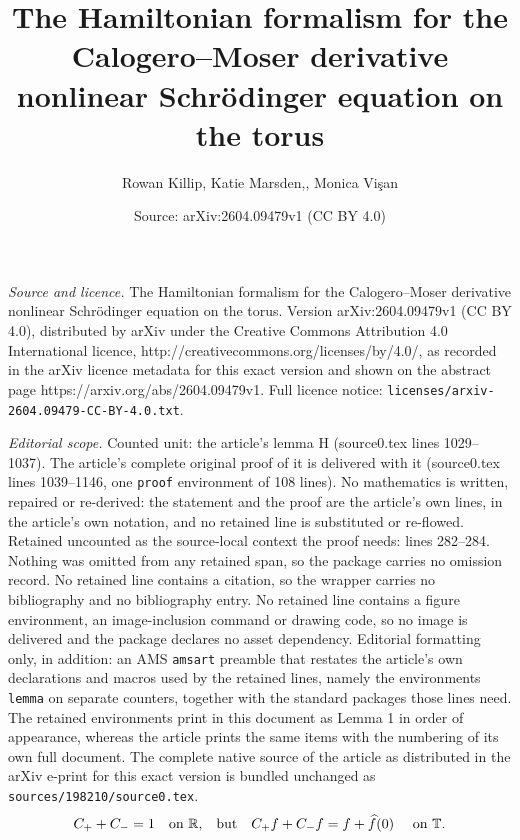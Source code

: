 \documentclass[10pt,a4paper]{amsart}
\title{The Hamiltonian formalism for the Calogero--Moser derivative nonlinear Schr\"odinger equation on the torus}
\author{Rowan Killip, Katie Marsden,, Monica Vi\c{s}an}
\date{Source: arXiv:2604.09479v1 (CC BY 4.0)}
\newcommand{\R}{\mathbb{R}}
\newcommand{\T}{\mathbb{T}}
\begin{document}
\maketitle

\noindent\emph{Source and licence.} The Hamiltonian formalism for the Calogero--Moser derivative nonlinear Schr\"odinger equation on the torus. Version arXiv:2604.09479v1 (CC BY 4.0), distributed by arXiv under the Creative Commons Attribution 4.0 International licence, http://creativecommons.org/licenses/by/4.0/, as recorded in the arXiv licence metadata for this exact version and shown on the abstract page https://arxiv.org/abs/2604.09479v1. Full licence notice: \texttt{licenses/arxiv-2604.09479-CC-BY-4.0.txt}.\par\smallskip

\noindent\textit{Editorial scope.} Counted unit: the article's lemma H (source0.tex lines 1029--1037). The article's complete original proof of it is delivered with it (source0.tex lines 1039--1146, one \texttt{proof} environment of 108 lines). No mathematics is written, repaired or re-derived: the statement and the proof are the article's own lines, in the article's own notation, and no retained line is substituted or re-flowed.  Retained uncounted as the source-local context the proof needs: lines 282--284.  Nothing was omitted from any retained span, so the package carries no omission record.  No retained line contains a citation, so the wrapper carries no bibliography and no bibliography entry.  No retained line contains a figure environment, an image-inclusion command or drawing code, so no image is delivered and the package declares no asset dependency.  Editorial formatting only, in addition: an AMS \texttt{amsart} preamble that restates the article's own declarations and macros used by the retained lines, namely the environments \texttt{lemma} on separate counters, together with the standard packages those lines need.  The retained environments print in this document as Lemma 1 in order of appearance, whereas the article prints the same items with the numbering of its own full document.  The complete native source of the article as distributed in the arXiv e-print for this exact version is bundled unchanged as \texttt{sources/198210/source0.tex}.
\begin{align}\label{Cid}
C_++C_-=1 \quad \text{on $\R$,\quad but} \quad C_+ f + C_- f = f + \widehat f(0) \quad \text{ on $\T$.}
\end{align}
\end{document}
